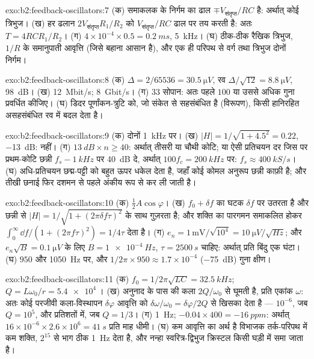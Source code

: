 \begin{solution}{exo:b2:feedback-oscillators:7}
(क) समाकलक के निर्गम का ढाल $\mp V_{\text{संतृप्त}}/RC$ है: अर्थात् कोई त्रिभुज। (ख)
हर ढलान $2V_{\text{संतृप्त}}R_1/R_2$ को $V_{\text{संतृप्त}}/RC$ ढाल पर तय करती है: अतः $T = 4RCR_1/R_2$।
(ग) $4 \times 10^{-4} \times 0.5 = \qty{0.2}{ms}$, \qty{5}{kHz}। (घ) ठीक-ठीक रैखिक
त्रिभुज, $1/R$ के समानुपाती आवृत्ति (जिसे बहाना आसान है), और एक ही परिपथ से वर्ग तथा
त्रिभुज दोनों निर्गम।
\end{solution}

\begin{solution}{exo:b2:feedback-oscillators:8}
(क) $\Delta = 2/65536 = \qty{30.5}{\micro V}$, रव $\Delta/\sqrt{12} = \qty{8.8}{\micro V}$,
\qty{98}{dB}। (ख) \qty{12}{Mbit/s}; \qty{8}{Gbit/s}। (ग) $33$ सोपान: अतः पहले
$100$ या उससे अधिक गुना प्रवर्धित कीजिए। (घ) डिदर पूर्णांकन-त्रुटि को, जो संकेत से
सहसंबंधित है (विरूपण), किसी हानिरहित असहसंबंधित रव में बदल देता है।
\end{solution}

\begin{solution}{exo:b2:feedback-oscillators:9}
(क) दोनों \qty{1}{kHz} पर। (ख) $|H| = 1/\sqrt{1 + 4.5^2} = 0.22$, \qty{-13}{dB}: नहीं। (ग)
$\qty{13}{dB} \times n \ge 40$: अर्थात् तीसरी या चौथी कोटि; या ऐसी प्रतिचयन दर
जिस पर प्रथम-कोटि छन्नी $f_s - \qty{1}{kHz}$ पर \qty{40}{dB} दे, अर्थात्
$100f_c = \qty{200}{kHz}$ पर: $f_s \approx \qty{400}{kS/s}$। (घ) अधि-प्रतिचयन छद्म-पट्टी को
बहुत ऊपर धकेल देता है, जहाँ कोई कोमल अनुरूप छन्नी काफ़ी है; और तीखी
छनाई फिर दशमन से पहले अंकीय रूप से कर ली जाती है।
\end{solution}

\begin{solution}{exo:b2:feedback-oscillators:10}
(क) $\tfrac12A\cos\varphi$। (ख) $f_0 + \delta f$ का घटक $\delta f$ पर उतरता है
और छन्नी से $|H| = 1/\sqrt{1 + (2\pi\delta f\tau)^2}$ के साथ गुज़रता है; और शक्ति का
पारगमन समाकलित होकर $\int_0^\infty\dd f/(1 + (2\pi f\tau)^2) = 1/4\tau$ देता है।
(ग) $e_n = 1\,\text{mV}/\sqrt{10^4} = \qty{10}{\micro V/\sqrt{Hz}}$; और $e_n\sqrt B = \qty{0.1}{\micro V}$ के
लिए $B = \qty{1e-4}{Hz}$, $\tau = \qty{2500}{s}$ चाहिए: अर्थात् प्रति बिंदु एक घंटा। (घ) $950$
और \qty{1050}{Hz} पर, और $1/2\pi \times 950 \approx 1.7 \times 10^{-4}$ (\qty{-75}{dB}) गुना क्षीण।
\end{solution}

\begin{solution}{exo:b2:feedback-oscillators:11}
(क) $f_0 = 1/2\pi\sqrt{LC} = \qty{32.5}{kHz}$; $Q = L\omega_0/r = \qty{5.4e4}{}$। (ख) अनुनाद
के पास  की कला $2Q/\omega_0$ से घूमती है, प्रति एकांक $\omega$: अतः कोई
परजीवी कला-विस्थापन $\delta\varphi$ आवृत्ति को $\delta\omega/\omega_0 =
\delta\varphi/2Q$ से खिसका देता है --- $10^{-6}$, जब $Q = 10^5$, और प्रतिशतों में, जब $Q = 1/3$। (ग) \qty{1}{Hz};
$-0.04 \times 400 = \qty{-16}{ppm}$: अर्थात् $16 \times 10^{-6} \times 2.6 \times 10^6 = \qty{41}{s}$ प्रति माह
धीमी। (घ) कम आवृत्ति का अर्थ है विभाजक तर्क-परिपथ में कम शक्ति, $2^{15}$
से भाग ठीक \qty{1}{Hz} देता है, और नन्हा स्वरित्र-द्विभुज क्रिस्टल किसी
घड़ी में समा जाता है।
\end{solution}

